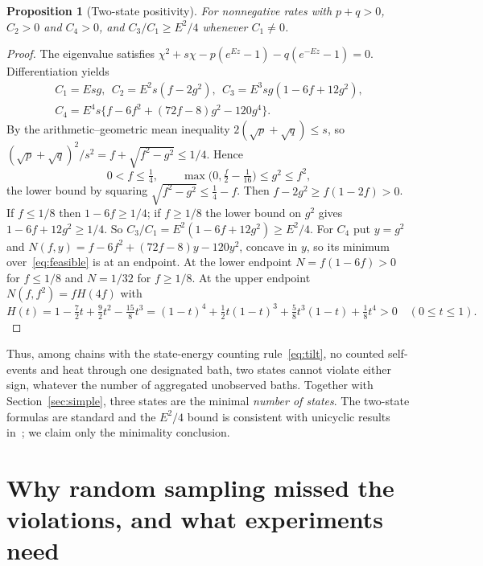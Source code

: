 \documentclass[11pt,a4paper]{article}
\newtheorem{proposition}[theorem]{Proposition}
\theoremstyle{remark}\newtheorem{remark}[theorem]{Remark}
\begin{document}
\begin{proposition}[Two-state positivity]\label{prop:twostate}
For nonnegative rates with $p+q>0$, $C_2>0$ and $C_4>0$, and $C_3/C_1\ge E^2/4$ whenever $C_1\ne0$.
\end{proposition}
\begin{proof}
The eigenvalue satisfies $\chi^2+s\chi-p(e^{Ez}-1)-q(e^{-Ez}-1)=0$. Differentiation yields
\begin{gather}\label{eq:twofour}
C_1=Esg,\ \ C_2=E^2s(f-2g^2),\ \ C_3=E^3sg(1-6f+12g^2),\\ C_4=E^4s\{f-6f^2+(72f-8)g^2-120g^4\}.
\end{gather}
By the arithmetic--geometric mean inequality $2(\sqrt p+\sqrt q)\le s$, so $(\sqrt p+\sqrt q)^2/s^2=f+\sqrt{f^2-g^2}\le1/4$. Hence
\begin{equation}\label{eq:feasible}
0<f\le\tfrac14,\qquad\max\bigl(0,\tfrac f2-\tfrac1{16}\bigr)\le g^2\le f^2 ,
\end{equation}
the lower bound by squaring $\sqrt{f^2-g^2}\le\frac14-f$. Then $f-2g^2\ge f(1-2f)>0$. If $f\le1/8$ then $1-6f\ge1/4$; if $f\ge1/8$ the lower bound on $g^2$ gives $1-6f+12g^2\ge1/4$. So $C_3/C_1=E^2(1-6f+12g^2)\ge E^2/4$. For $C_4$ put $y=g^2$ and $N(f,y)=f-6f^2+(72f-8)y-120y^2$, concave in $y$, so its minimum over~\eqref{eq:feasible} is at an endpoint. At the lower endpoint $N=f(1-6f)>0$ for $f\le1/8$ and $N=1/32$ for $f\ge1/8$. At the upper endpoint $N(f,f^2)=fH(4f)$ with
\begin{equation}
H(t)=1-\tfrac72t+\tfrac92t^2-\tfrac{15}{8}t^3=(1-t)^4+\tfrac12t(1-t)^3+\tfrac58t^3(1-t)+\tfrac18t^4>0\quad(0\le t\le1).
\end{equation}
\end{proof}
Thus, among chains with the state-energy counting rule~\eqref{eq:tilt}, no counted self-events and heat through one designated bath, two states cannot violate either sign, whatever the number of aggregated unobserved baths. Together with Section~\ref{sec:simple}, three states are the minimal \emph{number of states}. The two-state formulas are standard and the $E^2/4$ bound is consistent with unicyclic results in~\cite{Ptaszynski2022}; we claim only the minimality conclusion.

\section{Why random sampling missed the violations, and what experiments need}\label{sec:practice}
\end{document}
